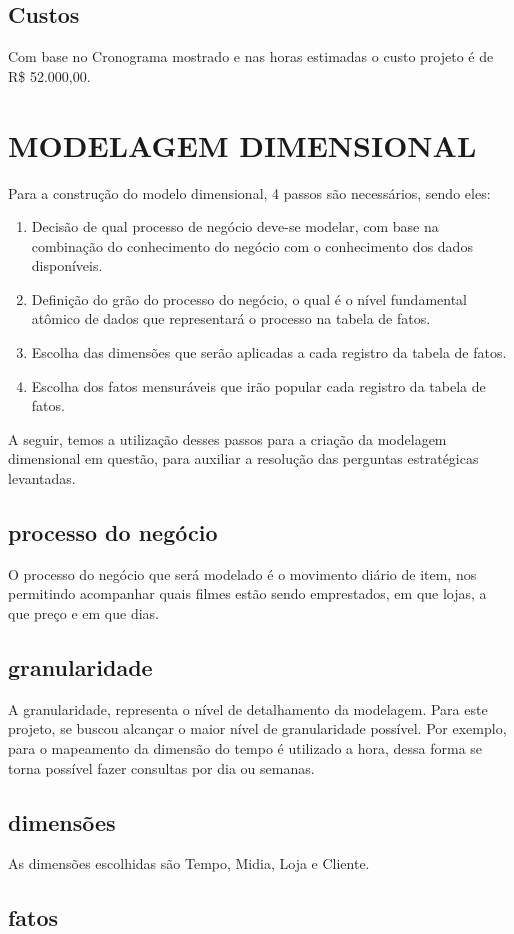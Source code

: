 \section{Custos}

Com base no Cronograma mostrado e nas horas estimadas o custo projeto é de R\$ 52.000,00.

\chapter{MODELAGEM DIMENSIONAL}

Para a construção do modelo dimensional, 4 passos são necessários, sendo eles:

\begin{enumerate}
\item Decisão de qual processo de negócio deve-se modelar, com base na combinação do conhecimento do negócio com o conhecimento dos dados disponíveis.
\item Definição do grão do processo do negócio, o qual é o nível fundamental atômico de dados que representará o processo na tabela de fatos.
\item Escolha das dimensões que serão aplicadas a cada registro da tabela de fatos.
\item Escolha dos fatos mensuráveis que irão popular cada registro da tabela de fatos.
\end{enumerate}

A seguir, temos a utilização desses passos para a criação da modelagem dimensional em questão, para auxiliar a resolução das perguntas estratégicas levantadas.
 
\section{processo do negócio}

O processo do negócio que será modelado é o movimento diário de item, nos permitindo acompanhar quais filmes estão sendo emprestados, em que lojas, a que preço e em que dias.


\section{granularidade}

A granularidade, representa o nível de
detalhamento da modelagem.
Para este projeto, se buscou alcançar o maior nível de granularidade possível. Por exemplo, para o 
mapeamento da dimensão do tempo é utilizado a hora, 
dessa forma se torna possível fazer 
consultas por dia ou semanas. 

\section{dimensões}

As dimensões escolhidas são Tempo, Midia, Loja e Cliente.  

\section{fatos}